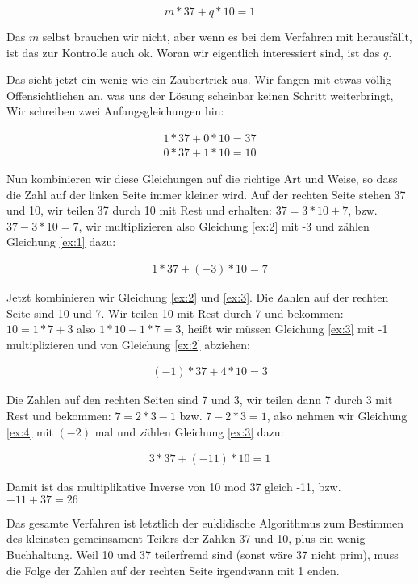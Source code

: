 \documentclass{article}
\newcounter{thm}
\begin{document}
$$  m * 37 + q * 10 = 1 $$

Das $m$ selbst brauchen wir nicht, aber wenn es bei dem Verfahren mit
herausfällt, ist das zur Kontrolle auch ok. Woran wir eigentlich interessiert
sind, ist das $q$.

Das sieht jetzt ein wenig wie ein Zaubertrick aus. Wir fangen mit etwas völlig
Offensichtlichen an, was uns der Lösung scheinbar keinen Schritt weiterbringt,
Wir schreiben zwei Anfangsgleichungen hin:

\begin{eqnarray}
    1 * 37 + 0 * 10 = 37  \label{ex:1} \\
    0 * 37 + 1 * 10 = 10  \label{ex:2}
\end{eqnarray}

Nun kombinieren wir diese Gleichungen auf die richtige Art und Weise, so dass
die Zahl auf der linken Seite immer kleiner wird. Auf der rechten Seite stehen
37 und 10, wir teilen 37 durch 10 mit Rest und erhalten: $37 = 3*10 + 7$,
bzw. $37 - 3 * 10 = 7$, wir multiplizieren also Gleichung \eqref{ex:2} mit -3 und
zählen Gleichung \eqref{ex:1} dazu:

\begin{eqnarray}
    1 *37 + (-3) * 10 = 7 \label{ex:3}
\end{eqnarray}

Jetzt kombinieren wir Gleichung \eqref{ex:2} und \eqref{ex:3}.
Die Zahlen auf der rechten Seite
sind 10 und 7. Wir teilen 10 mit Rest durch 7 und bekommen: $10 = 1 * 7 + 3$
also $1 * 10 - 1 * 7 = 3$, heißt wir müssen Gleichung \eqref{ex:3} mit -1
multiplizieren und von Gleichung \eqref{ex:2} abziehen:

\begin{eqnarray}
    (-1) * 37 + 4 * 10 = 3 \label{ex:4}
\end{eqnarray}

Die Zahlen auf den rechten Seiten sind 7 und 3, wir teilen dann 7 durch 3 mit
Rest und bekommen: $7 = 2*3 - 1$ bzw. $7 - 2*3 = 1$, also nehmen wir Gleichung
\eqref{ex:4} mit $(-2)$ mal und zählen Gleichung \eqref{ex:3} dazu:

\begin{eqnarray}
    3 * 37 + (-11) * 10 = 1
\end{eqnarray}

Damit ist das multiplikative Inverse von 10 mod 37 gleich -11, bzw. $-11 + 37
= 26$

Das gesamte Verfahren ist letztlich der euklidische Algorithmus zum Bestimmen
des kleinsten gemeinsament Teilers der Zahlen 37 und 10, plus ein wenig
Buchhaltung. Weil 10 und 37 teilerfremd sind (sonst wäre 37 nicht prim), muss
die Folge der Zahlen auf der rechten Seite irgendwann mit 1 enden.
\end{document}
